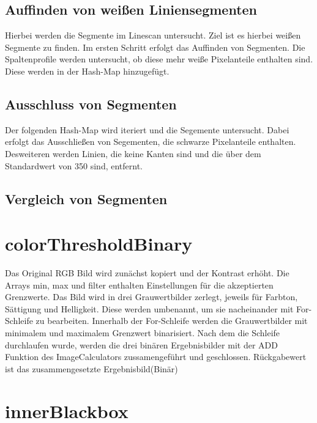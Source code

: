 \documentclass[a4paper,11pt,parskip]{article}
\begin{document}
\subsection{Auffinden von weißen Liniensegmenten}
Hierbei werden die Segmente im Linescan untersucht. Ziel ist es hierbei weißen Segmente zu finden. Im ersten Schritt erfolgt das Auffinden von Segmenten. Die Spaltenprofile werden untersucht, ob diese mehr weiße Pixelanteile enthalten sind. Diese werden in der Hash-Map hinzugefügt.\\

\subsection{Ausschluss von Segmenten}
Der folgenden Hash-Map wird iteriert und die Segemente untersucht. Dabei erfolgt das Ausschließen von Segementen, die schwarze Pixelanteile enthalten. Desweiteren werden Linien, die keine Kanten sind und die über dem Standardwert von 350 sind, entfernt. 

\subsection{Vergleich von Segmenten}


\section{colorThresholdBinary}
Das Original RGB Bild wird zunächst kopiert und der Kontrast erhöht. Die Arrays min, max und filter enthalten Einstellungen für die akzeptierten Grenzwerte. Das Bild wird in drei Grauwertbilder zerlegt, jeweils für Farbton, Sättigung und Helligkeit. Diese werden umbenannt, um sie nacheinander mit For-Schleife zu bearbeiten. Innerhalb der For-Schleife werden die Grauwertbilder mit minimalem und maximalem Grenzwert binarisiert. Nach dem die Schleife durchlaufen wurde, werden die drei binären Ergebnisbilder mit der ADD Funktion des ImageCalculators zussamengeführt und geschlossen. Rückgabewert ist das zusammengesetzte Ergebnisbild(Binär)
\section{innerBlackbox}

\end{document}
